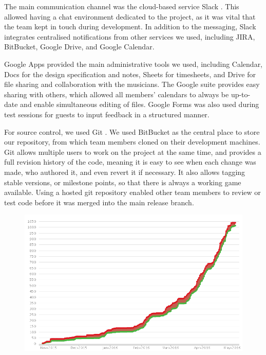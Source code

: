 \documentclass[a4paper,11pt]{article}
\begin{document}
The main communication channel was the cloud-based service Slack \cite{slack}. This allowed having a chat environment dedicated to the project, as it was vital that the team kept in touch during development. In addition to the messaging, Slack integrates centralised notifications from other services we used, including JIRA, BitBucket, Google Drive, and Google Calendar.

Google Apps \cite{google_apps} provided the main administrative tools we used, including Calendar, Docs for the design specification and notes, Sheets for timesheets, and Drive for file sharing and collaboration with the musicians. The Google suite provides easy sharing with others, which allowed all members’ calendars to always be up-to-date and enable simultaneous editing of files. Google Forms was also used during test sessions for guests to input feedback in a structured manner.

For source control, we used Git \cite{git}. We used BitBucket \cite{bitbucket} as the central place to store our repository, from which team members cloned on their development machines. Git allows multiple users to work on the project at the same time, and provides a full revision history of the code, meaning it is easy to see when each change was made, who authored it, and even revert it if necessary. It also allows tagging stable versions, or milestone points, so that there is always a working game available. Using a hosted git repository enabled other team members to review or test code before it was merged into the main release branch.

\begin{figure}[ht]
	\centering
    \includegraphics[width=.75\textwidth]{jira_open_vs_closed}
\end{figure}
\end{document}
